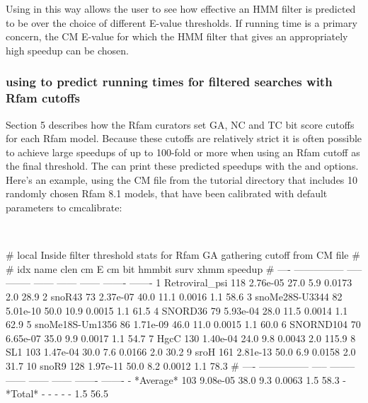 Using  in this way allows the user to see how effective
an HMM filter is predicted to be over the choice of different E-value
thresholds. If running time is a primary concern, the CM E-value for
which the HMM filter that gives an appropriately high speedup can be
chosen. 

\subsubsection{using  to predict running times for
  filtered searches with Rfam cutoffs}
Section 5 describes how the Rfam curators set GA, NC and TC bit score
cutoffs for each Rfam model. Because these cutoffs are relatively
strict it is often possible to achieve large speedups of up to
100-fold or more when using an Rfam cutoff as the final threshold. The
 can print these predicted speedups with the  and  options. Here's an example, using the
 CM file from the tutorial directory that includes
10 randomly chosen Rfam 8.1 models, that have been calibrated with
default parameters to cmcalibrate:

\\

\begin{sreoutput}
# local Inside filter threshold stats for Rfam GA gathering cutoff from CM file
#
#  idx  name              clen      cm E  cm bit  hmmbit    surv     xhmm  speedup
# ----  ---------------  -----  --------  ------  ------  ------  -------  -------
     1  Retroviral_psi     118  2.76e-05    27.0     5.9  0.0173      2.0     28.9
     2  snoR43              73  2.37e-07    40.0    11.1  0.0016      1.1     58.6
     3  snoMe28S-U3344      82  5.01e-10    50.0    10.9  0.0015      1.1     61.5
     4  SNORD36             79  5.93e-04    28.0    11.5  0.0014      1.1     62.9
     5  snoMe18S-Um1356     86  1.71e-09    46.0    11.0  0.0015      1.1     60.0
     6  SNORND104           70  6.65e-07    35.0     9.9  0.0017      1.1     54.7
     7  HgcC               130  1.40e-04    24.0     9.8  0.0043      2.0    115.9
     8  SL1                103  1.47e-04    30.0     7.6  0.0166      2.0     30.2
     9  sroH               161  2.81e-13    50.0     6.9  0.0158      2.0     31.7
    10  snoR9              128  1.97e-11    50.0     8.2  0.0012      1.1     78.3
# ----  ---------------  -----  --------  ------  ------  ------  -------  -------
     -  *Average*          103  9.08e-05    38.0     9.3  0.0063      1.5     58.3
     -  *Total*              -         -       -       -       -      1.5     56.5
\end{sreoutput}


